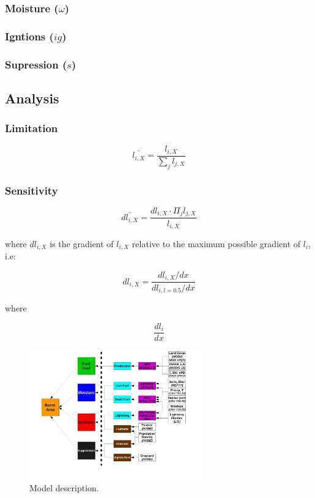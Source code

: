\documentclass[12pt]{article}
\begin{document}
\subsubsection{Moisture ($\omega$)}

\subsubsection{Igntions ($ig$)}

\subsubsection{Supression ($s$)}

\subsection{Analysis}

\subsubsection{Limitation}

\begin{equation}
    \bar{l_{i, X}} = \frac{l_{i, X}}{\sum_{j} l_{j, X}}
\end{equation}

\subsubsection{Sensitivity}

\begin{equation}
    \bar{dl_{i, X}} = \frac{dl_{i, X} \cdot \Pi_{j} l_{j, X}}{l_{i, X}}
\end{equation}

where $dl_{i, X}$ is the gradient of $l_{i, X}$ relative to the maximum possible gradient of $l_{i}$, i.e:

\begin{equation}
    dl_{i, X} = \frac{dl_{i, X} / dx}{dl_{i, l = 0.5} / dx}
\end{equation}

where

\begin{equation}
    \frac{dl_{i}}{dx}
\end{equation}

\begin{figure}[!ht]
  \centering
    \includegraphics[width=0.67\textwidth]{Model_schematic.pdf}
  \caption{Model description.}
\end{figure}
\end{document}
